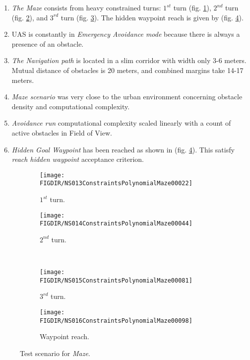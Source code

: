 \begin{enumerate}
    \item \emph{The Maze} consists from heavy constrained turns: $1^{st}$ turn (fig. \ref{fig:mazeFirstTurn}), $2^{nd}$ turn (fig. \ref{fig:mazeSecondTurn}), and $3^{rd}$ turn (fig. \ref{fig:mazeThirdTurn}). The hidden waypoint reach is given by (fig. \ref{fig:mazeWaypointReach}).
        
    \item UAS is constantly in \emph{Emergency Avoidance mode} because there is always a presence of an obstacle.
        
    \item \emph{The Navigation path} is located in a slim corridor with width only 3-6 meters. Mutual distance of obstacles is 20 meters, and combined margins take 14-17 meters.
        
    \item \emph{Maze scenario} was very close to the urban environment concerning obstacle density and computational complexity.
        
    \item \emph{Avoidance run} computational complexity scaled linearly with a count of active obstacles in Field of View.
    
    \item \emph{Hidden Goal Waypoint} has been reached as shown in (fig. \ref{fig:mazeWaypointReach}). This satisfy \emph{reach hidden waypoint} acceptance criterion. 
\end{enumerate}


\begin{figure}[H]
    \centering
    \begin{subfigure}{0.48\textwidth}
    	\centering
        \texttt{[image: \\FIGDIR/NS013ConstraintsPolynomialMaze00022]}
        \caption{$1^{st}$ turn.}
        \label{fig:mazeFirstTurn}
    \end{subfigure}
    \begin{subfigure}{0.48\textwidth}
	    \centering
        \texttt{[image: \\FIGDIR/NS014ConstraintsPolynomialMaze00044]} 
        \caption{$2^{nd}$ turn.}
        \label{fig:mazeSecondTurn}
    \end{subfigure}
    \\
    \begin{subfigure}{0.48\textwidth}
    	\centering
        \texttt{[image: \\FIGDIR/NS015ConstraintsPolynomialMaze00081]} 
        \caption{$3^{rd}$ turn.}
        \label{fig:mazeThirdTurn}
    \end{subfigure}
    \begin{subfigure}{0.48\textwidth}
    	\centering
        \texttt{[image: \\FIGDIR/NS016ConstraintsPolynomialMaze00098]} 
        \caption{Waypoint reach.}
        \label{fig:mazeWaypointReach}
    \end{subfigure}
    \caption{Test scenario for \emph{Maze}. }
    \label{fig:testCaseMazeSolver}
\end{figure}

